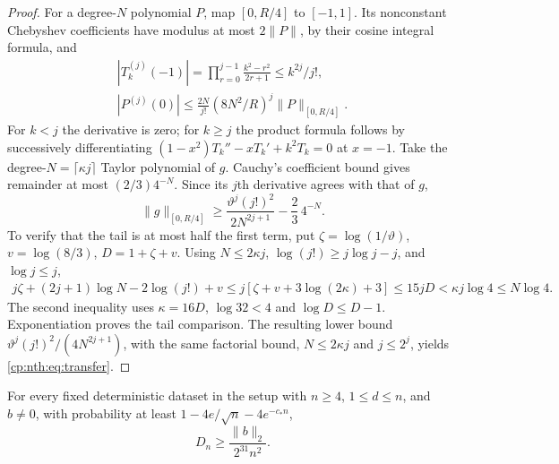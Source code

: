 \label{cp:nth:proof:analytic-transfer}{}

\begin{proof}
For a degree-\(N\) polynomial \(P\), map \([0,R/4]\) to \([-1,1]\). Its
nonconstant Chebyshev coefficients have modulus at most \(2\|P\|\), by
their cosine integral formula, and \[\begin{gathered}
|T_k^{(j)}(-1)|=\prod_{r=0}^{j-1}\frac{k^2-r^2}{2r+1}
\le k^{2j}/j!,\qquad\\
|P^{(j)}(0)|\le\frac{2N}{j!}(8N^2/R)^j\|P\|_{[0,R/4]}.
\end{gathered}\] For \(k<j\) the derivative is zero; for \(k\ge j\) the
product formula follows by successively differentiating
\((1-x^2)T_k''-xT_k'+k^2T_k=0\) at \(x=-1\). Take the
degree-\(N=\lceil\kappa j\rceil\) Taylor polynomial of \(g\). Cauchy's
coefficient bound gives remainder at most \((2/3)4^{-N}\). Since its
\(j\)th derivative agrees with that of \(g\), \[
\|g\|_{[0,R/4]}\ge
\frac{\vartheta^j(j!)^2}{2N^{2j+1}}-\frac23\,4^{-N}.
\] To verify that the tail is at most half the first term, put
\(\zeta=\log(1/\vartheta)\), \(v=\log(8/3)\), \(D=1+\zeta+v\). Using
\(N\le2\kappa j\), \(\log(j!)\ge j\log j-j\), and \(\log j\le j\),
\[\begin{gathered}
j\zeta+(2j+1)\log N-2\log(j!)+v
\le j[\zeta+v+3\log(2\kappa)+3]
\le15jD<\kappa j\log4\le N\log4.
\end{gathered}\] The second inequality uses \(\kappa=16D\), \(\log32<4\)
and \(\log D\le D-1\). Exponentiation proves the tail comparison. The
resulting lower bound \(\vartheta^j(j!)^2/(4N^{2j+1})\), with the same
factorial bound, \(N\le2\kappa j\) and \(j\le2^j\), yields
\eqref{cp:nth:eq:transfer}.
\end{proof}

\begin{lemma}\label{cp:nth:dense-small-ball}

For every fixed deterministic dataset in the setup with \(n\ge4\),
\(1\le d\le n\), and \(b\ne0\), with probability at least
\(1-4e/\sqrt n-4e^{-c_*n}\),
\begin{equation}\label{cp:nth:eq:dense-lower}{
D_n\ge\frac{\|b\|_2}{2^{31}n^2}.
}\end{equation}

\end{lemma}

\label{cp:nth:proof:dense-small-ball}{}

